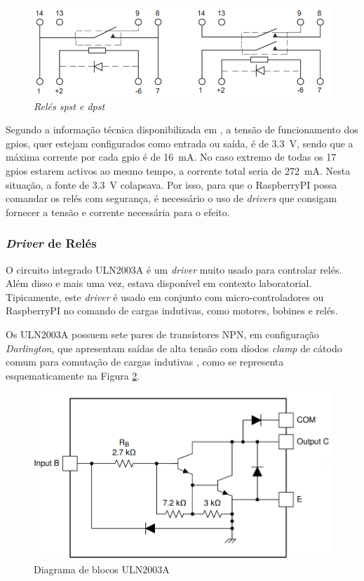\begin{figure}[hbtp]
    \centering
    \includegraphics[width=1\textwidth]{figures/reles.png}
    \caption{\textit{Relés \acrshort{spst} e \acrshort{dpst}} \cite{DryRelay}}
    \label{fig:reles}
\end{figure}

Segundo a informação técnica disponibilizada em \cite{Raspberrytech}, a tensão de funcionamento dos \acrfull{gpio}s, quer estejam configurados como entrada ou saída, é de \SI{3.3}{\volt}, sendo que a máxima corrente por cada \acrshort{gpio} é de \SI{16}{\mA}. No caso extremo de todas os 17 \acrshort{gpio}s estarem activos ao mesmo tempo, a corrente total seria de \SI{272}{\mA}. Nesta situação, a fonte de \SI{3.3}{\volt} colapsava.
Por isso, para que o RaspberryPI possa comandar os relés com segurança, é necessário o uso de \textit{drivers} que consigam fornecer a tensão e corrente necessária para o efeito.

\subsubsection{\textit{Driver} de Relés}
O circuito integrado ULN2003A é um \textit{driver} muito usado para controlar relés. Além disso e mais uma vez, estava disponível em contexto laboratorial.
Tipicamente, este \textit{driver} é usado em conjunto com micro-controladores ou \gls{RaspberryPI} no comando de cargas indutivas, como motores, bobines e relés.

Os ULN2003A possuem sete pares de transístores NPN, em configuração \textit{Darlington}, que apresentam saídas de alta tensão com díodos \textit{clamp} de cátodo comum para comutação de cargas indutivas \cite{ULN2003}, como se  representa esquematicamente na Figura \ref{fig:2003blocos}.

\begin{figure}[hbtp]
    \centering
    \includegraphics[width=1\textwidth]{figures/2003A_Darling.png}
    \caption{Diagrama de blocos ULN2003A \cite{ULN2003}}
    \label{fig:2003blocos}
\end{figure}

